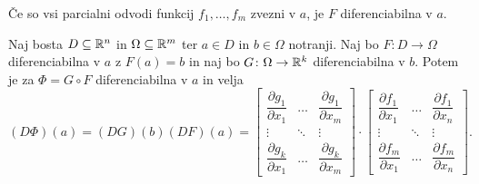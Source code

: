 \begin{posledica}
Če so vsi parcialni odvodi funkcij $f_1, \dots, f_m$ zvezni v $a$,
je $F$ diferenciabilna v $a$.
\end{posledica}


\begin{izrek}
Naj bosta $D \subseteq \mathbb{R}^n$ in $\Omega \subseteq \mathbb{R}^m$ ter
$a \in D$ in $b \in \Omega$ notranji. Naj bo
$F \colon D \to \Omega$ diferenciabilna v $a$ z $F(a)=b$ in naj bo
$G \colon \Omega \to \mathbb{R}^k$ diferenciabilna v $b$. Potem je za
$\Phi = G \circ F$ diferenciabilna v $a$ in velja
\[
(D \Phi)(a) = (DG)(b)(DF)(a) =
\begin{bmatrix}
\dfrac{\partial g_1}{\partial x_1} &
\dots                             &
\dfrac{\partial g_1}{\partial x_m} \\ 
\vdots                            &
\ddots                            &
\vdots                            \\ 
\dfrac{\partial g_k}{\partial x_1} &
\dots                             &
\dfrac{\partial g_k}{\partial x_m}
\end{bmatrix}
\cdot
\begin{bmatrix}
\dfrac{\partial f_1}{\partial x_1} &
\dots                             &
\dfrac{\partial f_1}{\partial x_n} \\ 
\vdots                            &
\ddots                            &
\vdots                            \\ 
\dfrac{\partial f_m}{\partial x_1} &
\dots                             &
\dfrac{\partial f_m}{\partial x_n}
\end{bmatrix}.
\]
\end{izrek}

